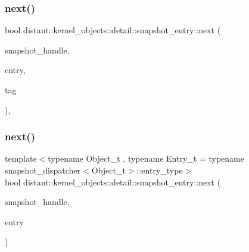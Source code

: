 \mbox{\label{namespacedistant_1_1kernel__objects_1_1detail_1_1snapshot__entry_a7767a66970fba76928540cfc66294190}} 
\subsubsection{\texorpdfstring{next()}{next()}\hspace{0.1cm}{\footnotesize\ttfamily [1/2]}}
{\footnotesize\ttfamily bool distant\+::kernel\+\_\+objects\+::detail\+::snapshot\+\_\+entry\+::next (\begin{DoxyParamCaption}\item[{boost\+::winapi\+::\+H\+A\+N\+D\+L\+E\+\_\+}]{snapshot\+\_\+handle,  }\item[{\mbox{\hyperlink{namespaceboost_1_1winapi_aa148b1a2cd4a16c95b05b56d8b31cc4c}{boost\+::winapi\+::\+P\+R\+O\+C\+E\+S\+S\+E\+N\+T\+R\+Y32\+\_\+}} $\ast$}]{entry,  }\item[{\mbox{\hyperlink{classdistant_1_1detail_1_1process__tag}{distant\+::detail\+::process\+\_\+tag}}}]{tag }\end{DoxyParamCaption})\hspace{0.3cm}{\ttfamily [inline]}, {\ttfamily [noexcept]}}

\mbox{\label{namespacedistant_1_1kernel__objects_1_1detail_1_1snapshot__entry_afc790b36a5e3234fe47fb33848a53a08}} 
\subsubsection{\texorpdfstring{next()}{next()}\hspace{0.1cm}{\footnotesize\ttfamily [2/2]}}
{\footnotesize\ttfamily template$<$typename Object\+\_\+t , typename Entry\+\_\+t  = typename snapshot\+\_\+dispatcher$<$\+Object\+\_\+t$>$\+::entry\+\_\+type$>$ \\
bool distant\+::kernel\+\_\+objects\+::detail\+::snapshot\+\_\+entry\+::next (\begin{DoxyParamCaption}\item[{boost\+::winapi\+::\+H\+A\+N\+D\+L\+E\+\_\+}]{snapshot\+\_\+handle,  }\item[{Entry\+\_\+t \&}]{entry }\end{DoxyParamCaption})\hspace{0.3cm}{\ttfamily [noexcept]}}

